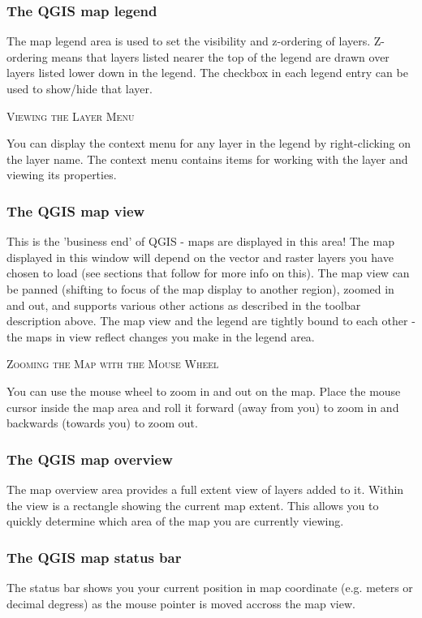 \documentclass[10pt,english]{article}
\newcommand\qgistip[1]{\raggedright\small{#1}}
\begin{document}
\begin{onehalfspace}
\subsubsection{The QGIS map legend}
The map legend area is used to set the visibility and z-ordering of layers.
Z-ordering means that layers listed nearer the top of the legend are drawn
over layers listed lower down in the legend. The checkbox in each legend entry
can be used to show/hide that layer.
\begin{Tip} \caption{\textsc{Viewing the Layer Menu}}
\qgistip{You can display the context menu for any layer in the legend by right-clicking
on the layer name. The context menu contains items for working with the layer and viewing
its properties.}
\end{Tip}

\subsubsection{The QGIS map view}

This is the 'business end' of QGIS - maps are displayed in this area! The map
displayed in this window will depend on the vector and raster layers you have
chosen to load (see sections that follow for more info on this). The map view
can be panned (shifting to focus of the map display to another region), zoomed
in and out, and supports various other actions as described in the toolbar
description above.  The map view and the legend are tightly bound to each
other - the maps in view reflect changes you make in the legend area.  
\begin{Tip}\caption{\textsc{Zooming the Map with the Mouse Wheel}}
\qgistip{You can use the mouse wheel to zoom in and out on the map. Place the mouse cursor inside the map area and roll it forward (away from you) to zoom in and backwards (towards you) to zoom out.
}
\end{Tip}
\subsubsection{The QGIS map overview}
The map overview area provides a full extent view of layers added to it. Within the view is a rectangle showing the current map extent. This allows you to quickly determine which area of the map you are currently viewing.

\subsubsection{The QGIS map status bar} 
The status bar shows you your current position in map coordinate (e.g. meters
or decimal degress) as the mouse pointer is moved accross the map view.


\end{onehalfspace}
\end{document}
